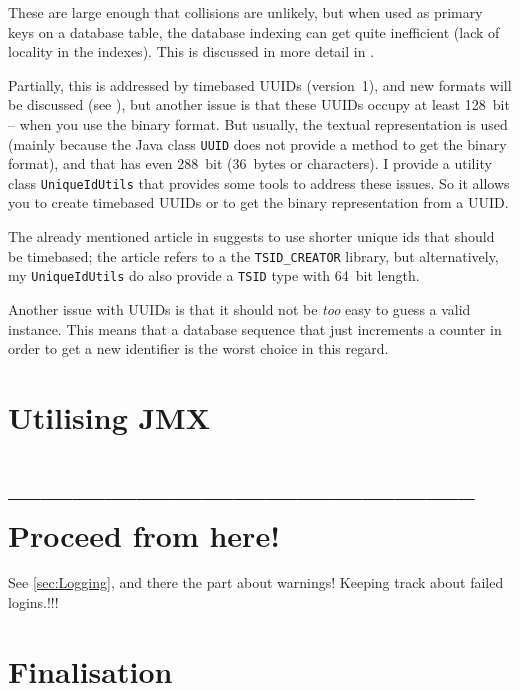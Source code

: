 These are large enough that collisions are unlikely, but when used as primary keys on a database table, the database indexing can get quite inefficient (lack of locality in the indexes). This is discussed in more detail in \autocite{Mihalcea:UUID_Database_Primary_Key}.

Partially, this is addressed by timebased UUIDs (version~1), and new formats will be discussed (see \autocite{Davis:NewUUIDs, Leach:RFC4122bis}), but another issue is that these UUIDs occupy at least 128~bit – when you use the binary format. But usually, the textual representation is used (mainly because the Java class \lstinline|UUID| does not provide a method to get the binary format), and that has even 288~bit (36~bytes or characters). I provide a utility class \lstinline|UniqueIdUtils|\autocite{TQUADRAT_ORG_FOUNDATION_UNIQUEIDUTILS} that provides some tools to address these issues. So it allows you to create timebased UUIDs or to get the binary representation from a UUID.

The already mentioned article in \autocite{Mihalcea:UUID_Database_Primary_Key} suggests to use shorter unique ids that should be timebased; the article refers to a the \verb#TSID_CREATOR# library\autocite{Lima:TSID_CREATOR}, but alternatively, my \lstinline|UniqueIdUtils| do also provide a \lstinline|TSID| type with 64~bit length.

Another issue with UUIDs is that it should not be \textit{too} easy to guess a valid instance. This means that a database sequence\autocite{TOAD_WORLD_BLOG:DatabaseSequence} that just increments a counter in order to get a new identifier is the worst choice in this regard.


\section{Utilising JMX}\label{sec:UtilisingJMX}
\section{-------------------------------------------- Proceed from here!}
See \ref{sec:Logging}, and there the part about warnings! Keeping track about failed logins.!!!
\lipsum[1]


\section{Finalisation}\label{sec:Finalisation}
